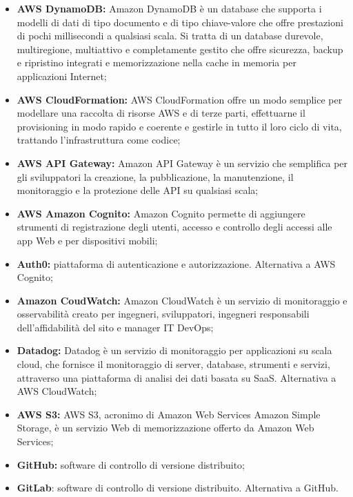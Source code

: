 \begin{itemize}
    \item \textbf{AWS DynamoDB:} Amazon DynamoDB è un database che supporta i modelli di dati di tipo documento e di tipo chiave-valore che offre prestazioni di pochi millisecondi a qualsiasi scala. Si tratta di un database durevole, multiregione, multiattivo e completamente gestito che offre sicurezza, backup e ripristino integrati e memorizzazione nella cache in memoria per applicazioni Internet;
    \item \textbf{AWS CloudFormation:} AWS CloudFormation offre un modo semplice per modellare una raccolta di risorse AWS e di terze parti, effettuarne il provisioning in modo rapido e coerente e gestirle in tutto il loro ciclo di vita, trattando l'infrastruttura come codice;
    \item \textbf{AWS API Gateway:} Amazon API Gateway è un servizio che semplifica per gli sviluppatori la creazione, la pubblicazione, la manutenzione, il monitoraggio e la protezione delle API su qualsiasi scala;
    \item \textbf{AWS Amazon Cognito:} Amazon Cognito permette di aggiungere strumenti di registrazione degli utenti, accesso e controllo degli accessi alle app Web e per dispositivi mobili;
    \item \textbf{Auth0:} piattaforma di autenticazione e autorizzazione. Alternativa a AWS Cognito;
    \item \textbf{Amazon CoudWatch:} Amazon CloudWatch è un servizio di monitoraggio e osservabilità creato per ingegneri, sviluppatori, ingegneri responsabili dell'affidabilità del sito e manager IT DevOps;
    \item \textbf{Datadog:} Datadog è un servizio di monitoraggio per applicazioni su scala cloud, che fornisce il monitoraggio di server, database, strumenti e servizi, attraverso una piattaforma di analisi dei dati basata su SaaS. Alternativa a AWS CloudWatch;
    \item \textbf{AWS S3:} AWS S3, acronimo di Amazon Web Services Amazon Simple Storage, è un servizio Web di memorizzazione offerto da Amazon Web Services;
    \item \textbf{GitHub:} software di controllo di versione distribuito; 
    \item \textbf{GitLab}: software di controllo di versione distribuito. Alternativa a GitHub.
\end{itemize}
